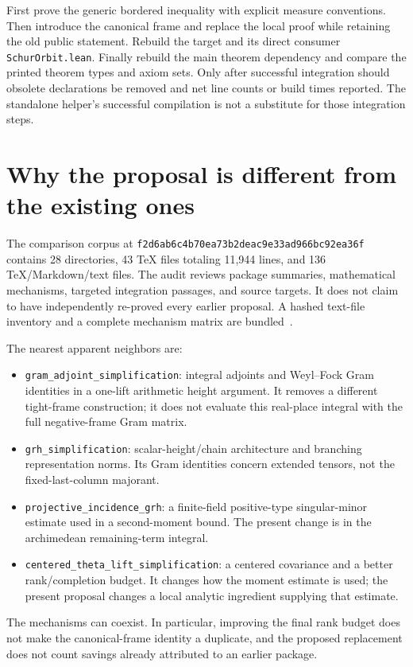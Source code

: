 \documentclass[11pt,letterpaper]{article}
\theoremstyle{remark}
\newcommand{\code}[1]{{\small\urlstyle{tt}\nolinkurl{#1}}}
\newcommand{\rev}{\code{f2d6ab6c4b70ea73b2deac9e33ad966bc92ea36f}}
\begin{document}
First prove the generic bordered inequality with explicit measure conventions.
Then introduce the canonical frame and replace the local proof while retaining
the old public statement. Rebuild the target and its direct consumer
\code{SchurOrbit.lean}. Finally rebuild the main theorem dependency and compare
the printed theorem types and axiom sets. Only after successful integration
should obsolete declarations be removed and net line counts or build times
reported. The standalone helper's successful compilation is not a substitute
for those integration steps.

\section{Why the proposal is different from the existing ones}

The comparison corpus at \rev{} contains 28 directories, 43 TeX files totaling
11,944 lines, and 136 TeX/Markdown/text files. The audit reviews package summaries,
mathematical mechanisms, targeted integration passages, and source targets. It
does not claim to have independently re-proved every earlier proposal. A hashed
text-file inventory and a complete mechanism matrix are bundled~\cite{comparison}.

The nearest apparent neighbors are:
\begin{itemize}
\item \code{gram_adjoint_simplification}: integral adjoints and Weyl--Fock Gram
identities in a one-lift arithmetic height argument. It removes a different
tight-frame construction; it does not evaluate this real-place integral with
the full negative-frame Gram matrix.
\item \code{grh_simplification}: scalar-height/chain architecture and branching
representation norms. Its Gram identities concern extended tensors, not the
fixed-last-column majorant.
\item \code{projective_incidence_grh}: a finite-field positive-type singular-minor
estimate used in a second-moment bound. The present change is in the
archimedean remaining-term integral.
\item \code{centered_theta_lift_simplification}: a centered covariance and a better
rank/completion budget. It changes how the moment estimate is used; the present
proposal changes a local analytic ingredient supplying that estimate.
\end{itemize}

The mechanisms can coexist. In particular, improving the final rank budget does
not make the canonical-frame identity a duplicate, and the proposed replacement
does not count savings already attributed to an earlier package.
\end{document}
